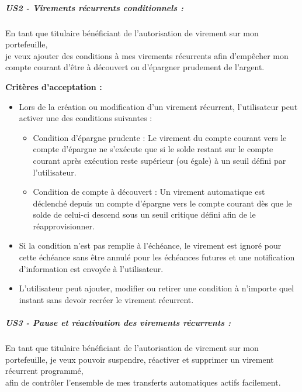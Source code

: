 \hypertarget{us2---virements-ruxe9currents-conditionnels}{%
\subparagraph{US2 - Virements récurrents conditionnels
:}\label{us2---virements-ruxe9currents-conditionnels}}

En tant que titulaire bénéficiant de l'autorisation de virement sur mon
portefeuille,\\
je veux ajouter des conditions à mes virements récurrents afin
d'empêcher mon compte courant d'être à découvert ou d'épargner prudement
de l'argent.

\textbf{Critères d'acceptation :}

\begin{itemize}
\tightlist
\item
  Lors de la création ou modification d'un virement récurrent,
  l'utilisateur peut activer une des conditions suivantes :

  \begin{itemize}
  \tightlist
  \item
    Condition d'épargne prudente : Le virement du compte courant vers le
    compte d'épargne ne s'exécute que si le solde restant sur le compte
    courant après exécution reste supérieur (ou égale) à un seuil défini
    par l'utilisateur.
  \item
    Condition de compte à découvert : Un virement automatique est
    déclenché depuis un compte d'épargne vers le compte courant dès que
    le solde de celui-ci descend sous un seuil critique défini afin de
    le réapprovisionner.
  \end{itemize}
\item
  Si la condition n'est pas remplie à l'échéance, le virement est ignoré
  pour cette échéance sans être annulé pour les échéances futures et une
  notification d'information est envoyée à l'utilisateur.
\item
  L'utilisateur peut ajouter, modifier ou retirer une condition à
  n'importe quel instant sans devoir recréer le virement récurrent.
\end{itemize}

\hypertarget{us3---pause-et-ruxe9activation-des-virements-ruxe9currents}{%
\subparagraph{US3 - Pause et réactivation des virements récurrents
:}\label{us3---pause-et-ruxe9activation-des-virements-ruxe9currents}}

En tant que titulaire bénéficiant de l'autorisation de virement sur mon
portefeuille, je veux pouvoir suspendre, réactiver et supprimer un
virement récurrent programmé,\\
afin de contrôler l'ensemble de mes transferts automatiques actifs
facilement.

